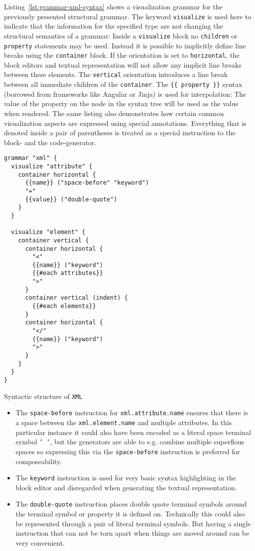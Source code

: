 \documentclass[sigconf,natbib=false,review=true]{acmart}
\begin{document}
Listing~\ref{lst:grammar-xml-syntax} shows a visualization grammar for the previously presented structural grammar. The keyword \texttt{visualize} is used here to indicate that the information for the specified type are not changing the structural semantics of a grammar: Inside a \texttt{visualize} block no \texttt{children} or \texttt{property} statements may be used. Instead it is possible to implicitly define line breaks using the \texttt{container} block. If the orientation is set to \texttt{horizontal}, the block editors and textual representation will not allow any implicit line breaks between these elements. The \texttt{vertical} orientation introduces a line break between all immediate children of the \texttt{container}. The \texttt{\{\{ property \}\}} syntax (borrowed from frameworks like Angular or Jinja) is used for interpolation: The value of the property on the node in the syntax tree will be used as the value when rendered. The same listing also demonstrates how certain common visualization aspects are expressed using special annotations. Everything that is denoted inside a pair of parentheses is treated as a special instruction to the block- and the code-generator.

\begin{listing}[H]
\begin{verbatim}
grammar "xml" {
  visualize "attribute" {
    container horizontal {
      {{name}} ("space-before" "keyword")
      "="
      {{value}} ("double-quote")
    }
  }

  visualize "element" {
    container vertical {
      container horizontal {
        "<"
        {{name}} ("keyword")
        {{#each attributes}}
        ">"
      }
      container vertical (indent) {
        {{#each elements}}
      }
      container horizontal {
        "</"
        {{name}} ("keyword")
        ">"
      }
    }
  }
}
\end{verbatim}
\caption{Syntactic structure of \texttt{XML}}
\label{lst:grammar-xml-syntax}
\end{listing}

\begin{itemize}
\item The \texttt{space-before} instruction for \texttt{xml.attribute.name} ensures that there is a space between the \texttt{xml.element.name} and multiple attributes. In this particular instance it could also have been encoded as a literal space terminal symbol \texttt{'~'}, but the generators are able to e.g. combine multiple superflous spaces so expressing this via the \texttt{space-before} instruction is preferred for composeability.
\item The \texttt{keyword} instruction is used for very basic syntax highlighting in the block editor and disregarded when generating the textual representation.
\item The \texttt{double-quote} instruction places double quote terminal symbols around the terminal symbol or property it is defined on. Technically this could also be represented through a pair of literal terminal symbols. But having a single instruction that can not be torn apart when things are moved around can be very convenient.
\end{itemize}
\end{document}
